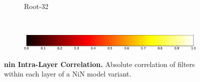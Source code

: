 \documentclass[thesis]{subfiles}
\begin{document}
{\begin{landscape}
\begin{figure}[p]
\begin{subfigure}[c]{0.97\linewidth}
					~
					~
					~
					~
					\caption{Root-32}\label{fig:corrroot32}
					\vspace*{0.6em}
				\end{subfigure}\\
				\begin{subfigure}[c]{0.97\linewidth}
    				\centering
	    			\includegraphics[width=0.4\linewidth]{Figs/PDF/colorbar}
				\end{subfigure}
				\caption[Intra-layer filter correlation]{\textbf{\Gls{nin} Intra-Layer Correlation.} Absolute correlation of filters within each layer of a NiN model variant.}
				\label{fig:nincorr}
			\end{figure}
		\end{landscape}
		\begin{landscape}
			\begin{figure}[p]
				\begin{subfigure}[c]{0.88\paperheight}

\end{subfigure}
\end{figure}
\end{landscape}}
\end{document}
